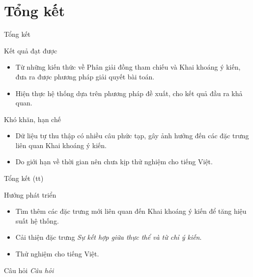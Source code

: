 \documentclass[9pt,xcolor=table]{beamer}
\begin{document}
	\section{Tổng kết}
		\begin{frame}{Tổng kết}			
			\begin{block}{Kết quả đạt được}
				\begin{itemize}
					\item Từ những kiến thức về Phân giải đồng tham chiếu và Khai khoáng ý kiến, đưa ra được phương pháp giải quyết bài toán.
					\item Hiện thực hệ thống dựa trên phương pháp đề xuất, cho kết quả đầu ra khả quan.				
				\end{itemize}
			\end{block}
			\begin{block}{Khó khăn, hạn chế}
				\begin{itemize}
					\item Dữ liệu tự thu thập có nhiều câu phức tạp, gây ảnh hưởng đến các đặc trưng liên quan Khai khoáng ý kiến. 
					\item Do giới hạn về thời gian nên chưa kịp thử nghiệm cho tiếng Việt.				
				\end{itemize}
			\end{block}
		\end{frame}
	
		\begin{frame}{Tổng kết (tt)}			
			\begin{block}{Hướng phát triển}
				\begin{itemize}
					\item Tìm thêm các đặc trưng mới liên quan đến Khai khoáng ý kiến để tăng hiệu suất hệ thống.
					\item Cải thiện đặc trưng \textit{Sự kết hợp giữa thực thể và từ chỉ ý kiến}.
					\item Thử nghiệm cho tiếng Việt.
				\end{itemize}
			\end{block}
		\end{frame}

		\begin{frame}{Câu hỏi}
			\Huge
			\centering
			\fontsize{30pt}{30}\selectfont
			\textit{Câu hỏi}
		\end{frame}
\end{document}

